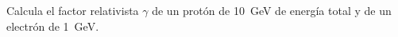 \documentclass[./../main.tex]{subfiles}
\begin{document}
    \begin{exercise}
        Calcula el factor relativista \(\gamma\) de un protón de \qty{10}{\GeV} de energía total y de un electrón de \qty{1}{\GeV}.
    \end{exercise}
\end{document}
